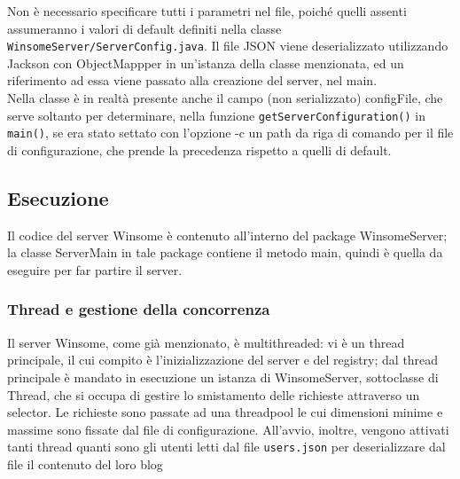 Non è necessario specificare tutti i parametri nel file, poiché quelli assenti assumeranno i valori di default definiti nella classe \verb|WinsomeServer/ServerConfig.java|. Il file JSON viene deserializzato utilizzando Jackson con ObjectMappper in un'istanza della classe menzionata, ed un riferimento ad essa viene passato alla creazione del server, nel main.\\
Nella classe è in realtà presente anche il campo (non serializzato) configFile, che serve soltanto per determinare, nella funzione \verb|getServerConfiguration()| in \verb|main()|, se era stato settato con l'opzione -c un path da riga di comando per il file di configurazione, che prende la precedenza rispetto a quelli di default.

\subsection{Esecuzione}
Il codice del server Winsome è contenuto all'interno del package WinsomeServer; la classe ServerMain in tale package contiene il metodo main, quindi è quella da eseguire per far partire il server.

\subsubsection{Thread e gestione della concorrenza}
Il server Winsome, come già menzionato, è multithreaded: vi è un thread principale, il cui compito è l'inizializzazione del server e del registry; dal thread principale è mandato in esecuzione un istanza di WinsomeServer, sottoclasse di Thread, che si occupa di gestire lo smistamento delle richieste attraverso un selector. Le richieste sono passate ad una threadpool le cui dimensioni minime e massime sono fissate dal file di configurazione. All'avvio, inoltre, vengono attivati tanti thread quanti sono gli utenti letti dal file \verb|users.json| per deserializzare dal file il contenuto del loro blog\\